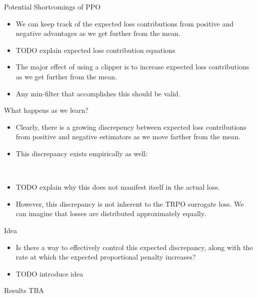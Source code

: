 \documentclass{beamer}
\begin{document}
\begin{frame}{Potential Shortcomings of PPO}
    \begin{itemize}
        \item We can keep track of the expected loss contributions from positive
            and negative advantages as we get further from the mean.
        \item TODO explain expected loss contribution equations
        \item The major effect of using a clipper is to increase expected loss
            contributions as we get further from the mean.
        \item Any min-filter that accomplishes this should be valid.
    \end{itemize}
        \framebreak
What happens as we learn?
\begin{center}
\end{center}
        \framebreak
    \begin{itemize}
        \item Clearly, there is a growing discrepency between expected loss
            contributions from positive and negative estimators as we move
            farther from the mean.
        \item This discrepancy exists empirically as well:
    \begin{center}
            \scalebox{0.3}{} \\
    \end{center}
        \item TODO explain why this does not manifest itself in the actual
            loss.
        \item However, this discrepancy is not inherent to the TRPO surrogate
            loss. We can imagine that losses are distributed approximately
            equally.
    \end{itemize}
\end{frame}

\begin{frame}{Idea}
    \begin{itemize}
        \item Is there a way to effectively control this expected discrepancy,
            along with the rate at which the expected proportional penalty
            increases?
        \item TODO introduce idea
    \end{itemize}
\end{frame}

\begin{frame}{Results}
    TBA
\end{frame}
\end{document}
